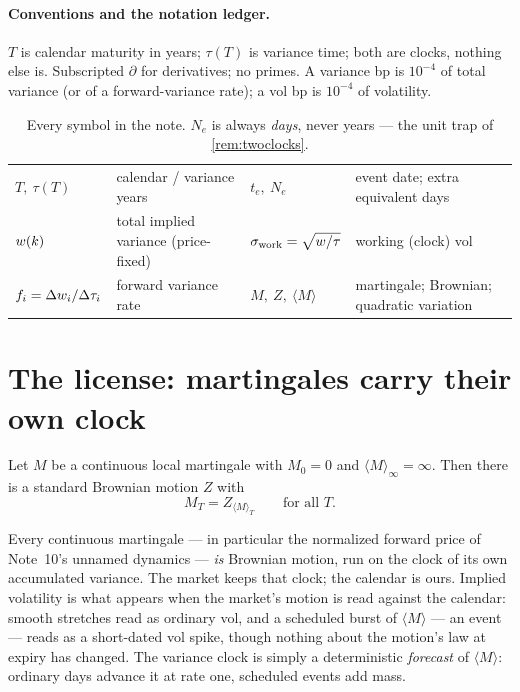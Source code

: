 \documentclass[11pt]{article}
\newcommand{\qv}[1]{\langle #1\rangle}
\begin{document}
\paragraph{Conventions and the notation ledger.}
$T$ is calendar maturity in years; $\tau(T)$ is variance time; both are
clocks, nothing else is.  Subscripted $\partial$ for derivatives; no
primes.  A variance bp is $10^{-4}$ of total variance (or of a
forward-variance rate); a vol bp is $10^{-4}$ of volatility.

\begin{table}[H]
\centering\footnotesize
\setlength{\tabcolsep}{3pt}
\begin{tabular}{@{}llll@{}}
\toprule
$T,\ \tau(T)$ & calendar / variance years &
$t_e,\ N_e$ & event date; extra equivalent days\\[2pt]
$w(k)$ & total implied variance (price-fixed) &
$\sigma_{\mathrm{work}}=\sqrt{w/\tau}$ & working (clock) vol\\[2pt]
$f_i=\Delta w_i/\Delta\tau_i$ & forward variance rate &
$M,\ Z,\ \qv{M}$ & martingale; Brownian; quadratic variation\\
\bottomrule
\end{tabular}
\caption{Every symbol in the note.  $N_e$ is always \emph{days}, never
years --- the unit trap of \cref{rem:twoclocks}.}
\label{tab:ledger}
\end{table}

\section{The license: martingales carry their own clock}
\label{sec:license}

\begin{theorem}
\label{thm:dds}
Let $M$ be a continuous local martingale with $M_0=0$ and
$\qv{M}_\infty=\infty$.  Then there is a standard Brownian motion $Z$
with
\[
M_T=Z_{\qv{M}_T}\qquad\text{for all }T .
\]
\end{theorem}

Every continuous martingale --- in particular the normalized forward
price of Note~10's unnamed dynamics --- \emph{is} Brownian motion, run
on the clock of its own accumulated variance.  The market keeps that
clock; the calendar is ours.  Implied volatility is what appears when
the market's motion is read against the calendar: smooth stretches read
as ordinary vol, and a scheduled burst of $\qv{M}$ --- an event ---
reads as a short-dated vol spike, though nothing about the motion's law
at expiry has changed.  The variance clock is simply a deterministic
\emph{forecast} of $\qv{M}$: ordinary days advance it at rate one,
scheduled events add mass.
\end{document}
